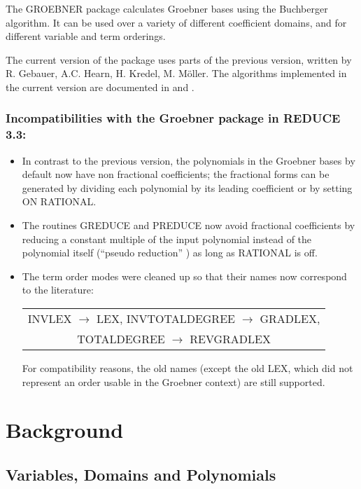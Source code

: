 The GROEBNER package calculates Groebner bases using the
Buchberger algorithm.  It can be used over a variety of different
coefficient domains, and for different variable and term orderings.

The current version of the package uses parts of the previous
version, written by  {\sc R. Gebauer, A.C. Hearn, H. Kredel, M.
M\"oller}. The algorithms implemented in the current version are
documented in \cite{FGLM} and \cite{GEMO88}.

\newpage
\subsubsection*{Incompatibilities with the Groebner package in
REDUCE 3.3:}
\begin{itemize}
\item In contrast to the previous version, the polynomials in the
Groebner bases by default now have non fractional coefficients;
the fractional forms can be generated by dividing each polynomial
by its leading coefficient or by setting ON RATIONAL.

\item The routines GREDUCE and PREDUCE now avoid fractional coefficients
by reducing a constant multiple of the input polynomial instead of the
polynomial itself (``pseudo reduction'' ) as long as RATIONAL is off.

\item The term order modes were cleaned up so that their names
now correspond to the literature:
\begin{center}
\begin{tabular}{c}
INVLEX $\rightarrow$ LEX, INVTOTALDEGREE $\rightarrow$
GRADLEX, \\
TOTALDEGREE $\rightarrow$ REVGRADLEX
\end{tabular}
\end{center}
 For compatibility reasons, the old names (except the old LEX, which
 did not represent an order usable in the Groebner context) are
 still supported.
\end{itemize}
\newpage
\tableofcontents

\newpage
\pagestyle{plain}
\section{Background}

\subsection{Variables, Domains and Polynomials}

